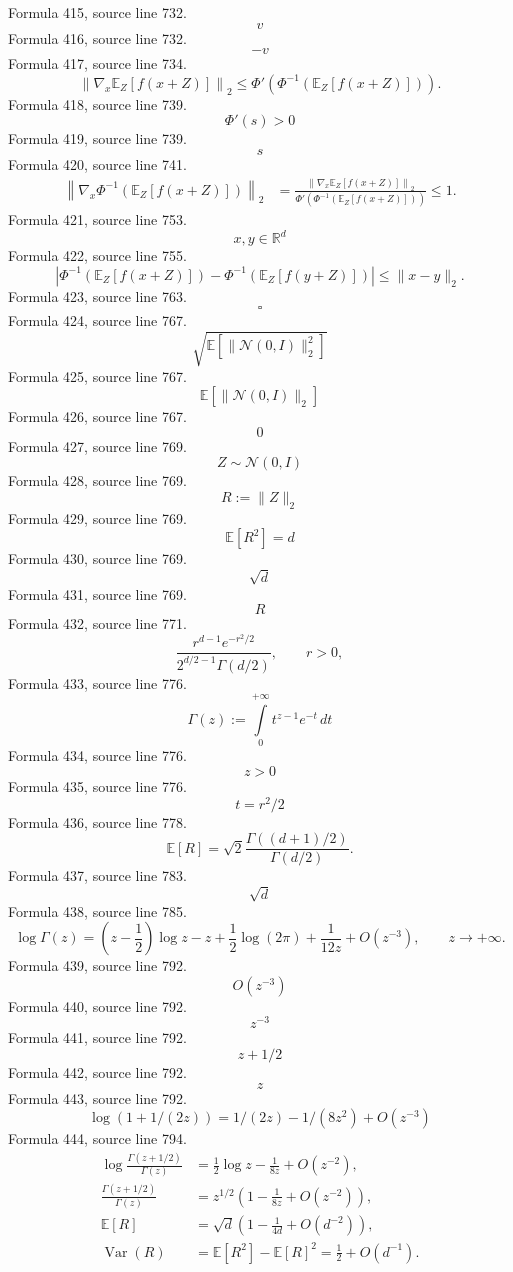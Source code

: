 \documentclass{ctexart}
\begin{document}
Formula 415, source line 732.
\[v\]
Formula 416, source line 732.
\[-v\]
Formula 417, source line 734.
\[
\left\|\nabla_x\mathbb E_Z[f(x+Z)]\right\|_2
\leq\Phi'\left(\Phi^{-1}\left(\mathbb E_Z[f(x+Z)]\right)\right).
\]
Formula 418, source line 739.
\[\Phi'(s)>0\]
Formula 419, source line 739.
\[s\]
Formula 420, source line 741.
\[
\begin{aligned}
\left\|\nabla_x\Phi^{-1}\left(\mathbb E_Z[f(x+Z)]\right)\right\|_2
&=\frac{
\left\|\nabla_x\mathbb E_Z[f(x+Z)]\right\|_2
}{
\Phi'\left(\Phi^{-1}\left(\mathbb E_Z[f(x+Z)]\right)\right)
}
\leq1.
\end{aligned}
\]
Formula 421, source line 753.
\[x,y\in\mathbb R^d\]
Formula 422, source line 755.
\[
\left|
\Phi^{-1}\left(\mathbb E_Z[f(x+Z)]\right)
-\Phi^{-1}\left(\mathbb E_Z[f(y+Z)]\right)
\right|
\leq\|x-y\|_2.
\]
Formula 423, source line 763.
\[\square\]
Formula 424, source line 767.
\[\sqrt{\mathbb E[\|\mathcal N(0,I)\|_2^2]}\]
Formula 425, source line 767.
\[\mathbb E[\|\mathcal N(0,I)\|_2]\]
Formula 426, source line 767.
\[0\]
Formula 427, source line 769.
\[Z\sim\mathcal N(0,I)\]
Formula 428, source line 769.
\[R:=\|Z\|_2\]
Formula 429, source line 769.
\[\mathbb E[R^2]=d\]
Formula 430, source line 769.
\[\sqrt d\]
Formula 431, source line 769.
\[R\]
Formula 432, source line 771.
\[
\frac{r^{d-1}e^{-r^2/2}}{2^{d/2-1}\Gamma(d/2)},
\qquad r>0,
\]
Formula 433, source line 776.
\[\Gamma(z):=\int\limits_0^{+\infty}t^{z-1}e^{-t}\,dt\]
Formula 434, source line 776.
\[z>0\]
Formula 435, source line 776.
\[t=r^2/2\]
Formula 436, source line 778.
\[
\mathbb E[R]
=\sqrt2\frac{\Gamma((d+1)/2)}{\Gamma(d/2)}.
\]
Formula 437, source line 783.
\[\sqrt d\]
Formula 438, source line 785.
\[
\log\Gamma(z)
=\left(z-\frac12\right)\log z-z
+\frac12\log(2\pi)+\frac1{12z}+O(z^{-3}),
\qquad z\to+\infty.
\]
Formula 439, source line 792.
\[O(z^{-3})\]
Formula 440, source line 792.
\[z^{-3}\]
Formula 441, source line 792.
\[z+1/2\]
Formula 442, source line 792.
\[z\]
Formula 443, source line 792.
\[\log(1+1/(2z))=1/(2z)-1/(8z^2)+O(z^{-3})\]
Formula 444, source line 794.
\[
\begin{aligned}
\log\frac{\Gamma(z+1/2)}{\Gamma(z)}
&=\frac12\log z-\frac1{8z}+O(z^{-2}),\\
\frac{\Gamma(z+1/2)}{\Gamma(z)}
&=z^{1/2}\left(1-\frac1{8z}+O(z^{-2})\right),\\
\mathbb E[R]
&=\sqrt d\left(1-\frac1{4d}+O(d^{-2})\right),\\
\operatorname{Var}(R)
&=\mathbb E[R^2]-\mathbb E[R]^2
=\frac12+O(d^{-1}).
\end{aligned}
\]
\end{document}
